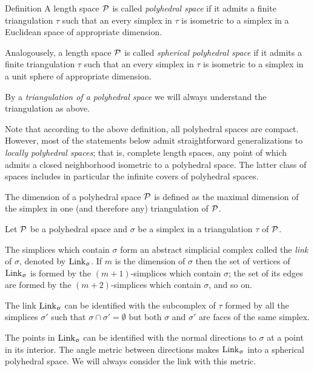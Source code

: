 \begin{thm}{Definition}\label{def:poly}
A length space $\mathcal{P}$ is called  
\emph{polyhedral space} 
if it admits a finite triangulation $\tau$ 
such that an every simplex in $\tau$ is isometric to a simplex in a Euclidean space of appropriate dimension.

Analogousely, a length space $\mathcal{P}$ is called  
\emph{spherical polyhedral space} 
if it admits a finite triangulation $\tau$ 
such that an every simplex in $\tau$ is isometric to a simplex in a unit sphere of appropriate dimension.

By a 
\emph{triangulation of a polyhedral space} 
we will always understand the triangulation as above. 
\end{thm}

Note that according to the above definition,
all polyhedral spaces are compact.
However, 
most of the statements below admit straightforward generalizations 
to \emph{locally polyhedral spaces};
that is, complete length spaces,  
any point of which admits a closed neighborhood isometric to a polyhedral space.
The latter class of spaces includes in particular the infinite covers of polyhedral spaces.

The dimension of a polyhedral space $\mathcal{P}$
is defined as the maximal dimension of the simplex 
in one (and therefore any) triangulation of $\mathcal{P}$.

Let $\mathcal{P}$ be a polyhedral space
and $\sigma$ be a simplex in a triangulation $\tau$ of $\mathcal{P}$.

The simplices which contain $\sigma$
form an abstract simplicial complex called the \emph{link} of $\sigma$, 
denoted by $\mathop{\rm Link}\nolimits_\upsigma$.
If $m$ is  the dimension of $\sigma$
then the set of vertices of $\mathop{\rm Link}\nolimits_\upsigma$
is formed by the $(m+1)$-simplices which contain $\sigma$;
the set of its edges are formed by the $(m+2)$-simplices 
which contain $\sigma$, and so on.

The link $\mathop{\rm Link}\nolimits_\upsigma$
can be identified with the subcomplex of $\tau$ 
formed by all the simplices $\sigma'$ 
such that $\sigma\cap\sigma'=\emptyset$ 
but both $\sigma$ and $\sigma'$ are faces of the same simplex.

The points in $\mathop{\rm Link}\nolimits_\upsigma$ can be identified with the normal directions to $\sigma$ at a point in its interior.
The angle metric between directions makes  $\mathop{\rm Link}\nolimits_\upsigma$ into a spherical polyhedral space.
We will always consider the link with this metric.

